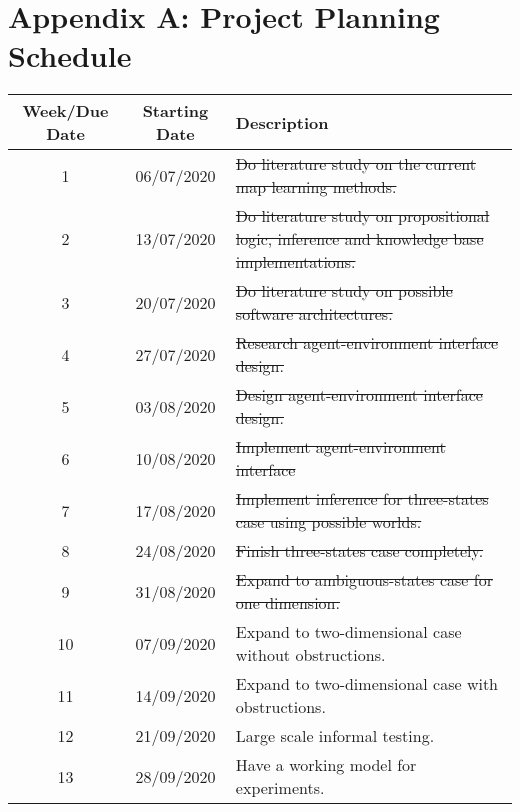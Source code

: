 \setcounter{table}{0}
\renewcommand{\thetable}{A.\arabic{table}}

\chapter{Appendix A:  Project Planning Schedule}

 \begin{table}[H]
  \begin{center}
    \begin{tabular}{|c|c|p{8cm}|} 
    \hline
      \textbf{Week/Due Date} & \textbf{Starting Date} & \textbf{Description}\\
      \hline
      \hline
      1 & 06/07/2020 & \sout{Do literature study on the current map learning methods.}\\ \hline
      
      2 & 13/07/2020 & \sout{Do literature study on propositional logic, 
      inference and knowledge base implementations.}\\ \hline
      
      3 & 20/07/2020 & \sout{Do literature study on possible software architectures.}\\ \hline
      
      4 & 27/07/2020 &  \sout{Research agent-environment interface design.} \\ \hline
      
      5  & 03/08/2020 & \sout{Design agent-environment interface design.}  \\ \hline
      
      6 & 10/08/2020 & \sout{Implement agent-environment interface}\\ \hline
      
      7 & 17/08/2020 & \sout{Implement inference for three-states case using possible worlds.} \\ \hline
      
      8 & 24/08/2020 & \sout{Finish three-states case completely.}\\ \hline
      
      9 & 31/08/2020 & \sout{Expand to ambiguous-states case for one dimension.}\\ \hline
      10 & 07/09/2020 & Expand to two-dimensional case without obstructions.\\ \hline
      11 & 14/09/2020 & Expand to two-dimensional case with obstructions.\\ \hline
      12 & 21/09/2020 & Large scale informal testing.\\ \hline
      13 & 28/09/2020 & Have a working model for experiments.\\ \hline


\end{tabular}
\end{center}
\end{table}
